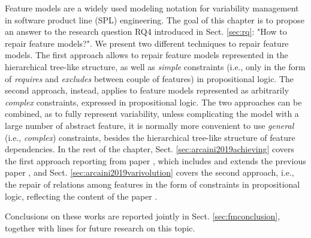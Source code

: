 \begin{tikzborder}{\cite{Gargantini16:validation}}
\begin{tikzborder}{\cite{gargantini_combinatorial_2017}}
\begin{tikzborder}{\cite{gargantini_combinatorial_2017}}
\begin{tikzborder}{\cite{garn2019}}
Feature models are a widely used modeling notation for variability management in software product line (SPL) engineering. 
The goal of this chapter is to propose an answer to the research question RQ4 introduced in Sect. \ref{sec:rq}: "How to repair feature models?".
We present two different techniques to repair feature models.
The first approach allows to repair feature models represented in the hierarchical tree-like structure, as well as \textit{simple} constraints (i.e., only in the form of \textit{requires} and \textit{excludes} between couple of features) in propositional logic.
The second approach, instead, applies to feature models represented as arbitrarily \textit{complex} constraints, expressed in propositional logic.
The two approaches can be combined, as to fully represent variability, unless complicating the model with a large number of abstract feature, it is normally more convenient to use \textit{general} (i.e., \textit{complex}) constraints, besides the hierarchical tree-like structure of feature dependencies.
In the rest of the chapter, Sect. \ref{sec:arcaini2019achieving} covers the first approach reporting from paper \cite{arcaini2019achieving}, which includes and extends the previous paper \cite{arcaini_evolutionary_2018}, and Sect. \ref{sec:arcaini2019varivolution} covers the second approach, i.e., the repair of relations among features in the form of constraints in propositional logic, reflecting the content of the paper \cite{arcaini2019varivolution}.

Conclusions on these works are reported jointly in Sect. \ref{sec:fmconclusion}, together with lines for future research on this topic.



\end{tikzborder}
\end{tikzborder}
\end{tikzborder}
\end{tikzborder}
